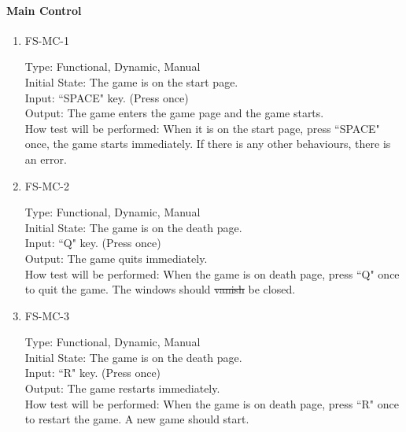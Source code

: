 \documentclass[12pt, titlepage]{article}
\begin{document}
\paragraph{Main Control}
\begin{enumerate}
\item {FS-MC-1\\}

Type: Functional, Dynamic, Manual\\
Initial State: The game is on the start page.\\
Input: ``SPACE" key. (Press once)\\
Output: The game enters the game page and the game starts.\\
How test will be performed: When it is on the start page, press ``SPACE" once, the game starts immediately. {\color{red} If there is any other behaviours, there is an error.}
\item {FS-MC-2\\}

Type: Functional, Dynamic, Manual\\
Initial State: The game is on the death page.\\
Input: ``Q" key. (Press once)\\
Output: The game quits immediately.\\
How test will be performed: When the game is on death page, press ``Q" once to quit the game. The windows should \sout{vanish} {\color{red}be closed}.
\item {FS-MC-3\\}

Type: Functional, Dynamic, Manual\\
Initial State: The game is on the death page.\\
Input: ``R" key. (Press once)\\
Output: The game restarts immediately.\\
How test will be performed: When the game is on death page, press ``R" once to restart the game. A new game should start.
\end{enumerate}
\end{document}
